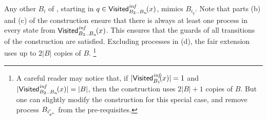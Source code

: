 
\-[(d)] Any other $B_i$ of \cutoffsys,
       starting in $q \in \mathsf{Visited}^{\textit{inf}}_{B_2..B_n}\!(x)$,
       mimics $B_{i_q}$.
\il
Note that parts (b) and (c) of the construction ensure that there is always at
       least one process in every state from $\mathsf{Visited}^{\textit{inf}}_{B_2..B_n}\!(x)$. This
       ensures that the guards of all transitions of the construction are satisfied.
Excluding processes in (d), the fair extension uses up to $2|B|$ copies of $B$.%
\footnote{A careful reader may notice that,
          if
          $|\mathsf{Visited}^{\textit{inf}}_{B_1}\!(x)|=1$ and $|\mathsf{Visited}^{\textit{inf}}_{B_2..B_n}\!(x)|=|B|$,
          then the construction uses $2|B|+1$ copies of $B$.
          But one can slightly modify the construction for this special case,
          and remove process $B_{i_{q^\star}'}$ from the pre-requisites.}
%
%
%
